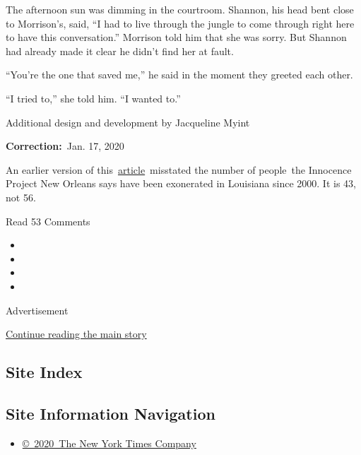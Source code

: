 The afternoon sun was dimming in the courtroom. Shannon, his head bent
close to Morrison's, said, ``I had to live through the jungle to come
through right here to have this conversation.'' Morrison told him that
she was sorry. But Shannon had already made it clear he didn't find her
at fault.

``You're the one that saved me,'' he said in the moment they greeted
each other.

``I tried to,'' she told him. ``I wanted to.''

Additional design and development by Jacqueline Myint

\textbf{Correction:}~Jan. 17, 2020

An earlier version of
this~\href{https://www.nytimes3xbfgragh.onion/interactive/2020/01/15/magazine/split-jurors.html}{article}~misstated
the number of people~the Innocence Project New Orleans says have been
exonerated in Louisiana since 2000. It is 43, not 56.

Read 53 Comments

\begin{itemize}
\item
\item
\item
\item
\end{itemize}

Advertisement

\protect\hyperlink{after-bottom}{Continue reading the main story}

\hypertarget{site-index}{%
\subsection{Site Index}\label{site-index}}

\hypertarget{site-information-navigation}{%
\subsection{Site Information
Navigation}\label{site-information-navigation}}

\begin{itemize}
\tightlist
\item
  \href{https://help.nytimes3xbfgragh.onion/hc/en-us/articles/115014792127-Copyright-notice}{©~2020~The
  New York Times Company}
\end{itemize}

